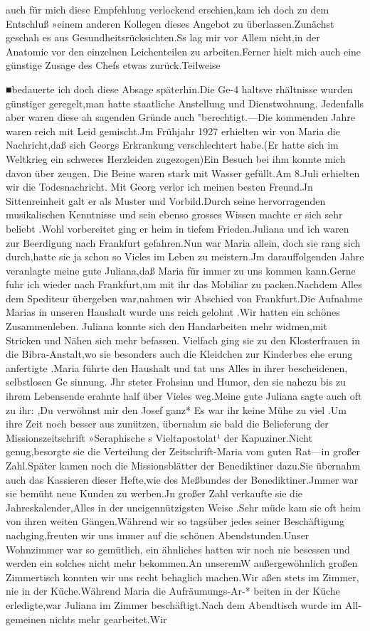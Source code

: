 \documentclass[a4paper,11pt]{article}
\begin{document}
auch für mich diese Empfehlung verlockend erschien,kam ich doch zu dem Entschluß »einem anderen Kollegen dieses Angebot zu überlassen.Zunächst geschah es aus Gesundheitsrücksichten.Ss lag mir vor Allem nicht,in der Anatomie vor den einzelnen Leichenteilen zu arbeiten.Ferner hielt mich auch eine günstige Zusage des Chefs etwas zurück.Teilweise

■bedauerte ich doch diese Absage späterhin.Die Ge-4 haltsve rhältnisse wurden günstiger geregelt,man hatte staatliche Anstellung und Dienstwohnung. Jedenfalls aber waren diese ah sagenden Gründe auch "berechtigt.—Die kommenden Jahre waren reich mit Leid gemischt.Jm Frühjahr 1927 erhielten wir von Maria die Nachricht,daß sich Georgs Erkrankung verschlechtert habe.(Er hatte sich im Weltkrieg ein schweres Herzleiden zugezogen)Ein Besuch bei ihm konnte mich davon über zeugen. Die Beine waren stark mit Wasser gefüllt.Am 8.Juli erhielten wir die Todesnachricht. Mit Georg verlor ich meinen besten Freund.Jn Sittenreinheit galt er als Muster und Vorbild.Durch seine hervorragenden musikalischen Kenntnisse und sein ebenso grosses Wissen machte er sich sehr beliebt .Wohl vorbereitet ging er heim in tiefem Frieden.Juliana und ich waren zur Beerdigung nach Frankfurt gefahren.Nun war Maria allein, doch sie rang sich durch,hatte sie ja schon so Vieles im Leben zu meistern.Jm darauffolgenden Jahre veranlagte meine gute Juliana,daß Maria für immer zu uns kommen kann.Gerne fuhr ich wieder nach Frankfurt,um mit ihr das Mobiliar zu packen.Nachdem Alles dem Spediteur übergeben war,nahmen wir Abschied von Frankfurt.Die Aufnahme Marias in unseren Haushalt wurde uns reich gelohnt .Wir hatten ein schönes Zusammenleben. Juliana konnte sich den Handarbeiten mehr widmen,mit Stricken und Nähen sich mehr befassen. Vielfach ging sie zu den Klosterfrauen in die Bibra-Anstalt,wo sie besonders auch die Kleidchen zur Kinderbes ehe erung anfertigte .Maria führte den Haushalt und tat uns Alles in ihrer bescheidenen, selbstlosen Ge sinnung. Jhr steter Frohsinn und Humor, den sie nahezu bis zu ihrem Lebensende erahnte half über Vieles weg.Meine gute Juliana sagte auch oft zu ihr: ,Du verwöhnst mir den Josef ganz* Es war ihr keine Mühe zu viel .Um ihre Zeit noch besser aus zunützen, übernahm sie bald die Belieferung der Missionszeitschrift »Seraphische s Vieltapostolat¹ der Kapuziner.Nicht genug,besorgte sie die Verteilung der Zeitschrift-Maria vom guten Rat—in großer Zahl.Später kamen noch die Missionsblätter der Benediktiner dazu.Sie übernahm auch das Kassieren dieser Hefte,wie des Meßbundes der Benediktiner.Jmmer war sie bemüht neue Kunden zu werben.Jn großer Zahl verkaufte sie die Jahreskalender,Alles in der uneigennützigsten Weise .Sehr müde kam sie oft heim von ihren weiten Gängen.Während wir so tagsüber jedes seiner Beschäftigung nachging,freuten wir uns immer auf die schönen Abendstunden.Unser Wohnzimmer war so gemütlich, ein ähnliches hatten wir noch nie besessen und werden ein solches nicht mehr bekommen.An unseremW außergewöhnlich großen Zimmertisch konnten wir uns recht behaglich machen.Wir aßen stets im Zimmer, nie in der Küche.Während Maria die Aufräumungs-Ar-* beiten in der Küche erledigte,war Juliana im Zimmer beschäftigt.Nach dem Abendtisch wurde im All-gemeinen nichts mehr gearbeitet.Wir 
\end{document}
